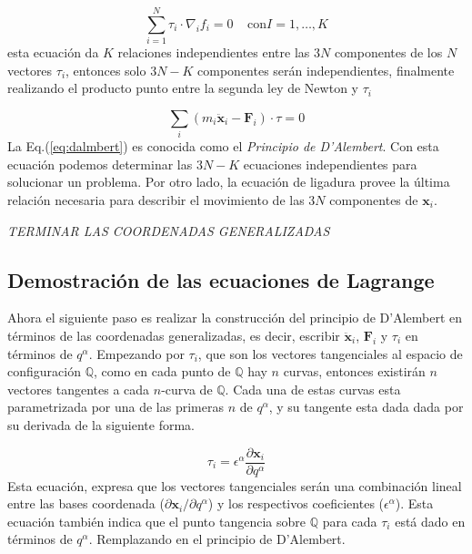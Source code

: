     \begin{equation*}
        \sum_{i = 1}^{N}\tau_i \cdot \nabla_i f_i = 0 \;\;\;\; \text{con} I = 1, \dots, K 
    \end{equation*}
    esta ecuación da $K$ relaciones independientes entre las $3N$ componentes de los $N$ vectores $\tau_i$, entonces solo $3N - K$ componentes serán independientes, finalmente realizando el producto punto entre la segunda ley de Newton y $\tau_i$

    \begin{equation}
        \sum_i (m_i\ddot{\mathbf{x}}_i - \mathbf{F}_i) \cdot \tau = 0
        \label{eq:dalmbert}
    \end{equation}
    La Eq.(\ref*{eq:dalmbert}) es conocida como el \textit{Principio de D'Alembert}. Con esta ecuación podemos determinar las $3N-K$ ecuaciones independientes para solucionar un problema. Por otro lado, la ecuación de ligadura provee la última relación necesaria para describir el movimiento de las $3N$ componentes de $\mathbf{x}_i$.

    \textit{TERMINAR LAS COORDENADAS GENERALIZADAS}
    
\subsection[short]{Demostración de las ecuaciones de Lagrange}


    Ahora el siguiente paso es realizar la construcción del principio de D'Alembert en términos de las coordenadas generalizadas, es decir, escribir $\mathbf{\ddot{x}}_i$, $\mathbf{F}_i$ y $\tau_i$ en términos de $q^{\alpha}$. Empezando por $\tau_i$, que son los vectores tangenciales al espacio de configuración $\mathbb{Q}$, como en cada punto de $\mathbb{Q}$ hay $n$ curvas, entonces existirán $n$ vectores tangentes a cada $n$-curva de $\mathbb{Q}$. Cada una de estas curvas esta parametrizada por una de las primeras $n$ de $q^{\alpha}$, y su tangente esta dada dada por su derivada de la siguiente forma. 

    \begin{equation*}
        \tau_i = \epsilon^{\alpha} \frac{\partial \mathbf{x}_i}{\partial q^{\alpha}}
    \end{equation*}
Esta ecuación, expresa que los vectores tangenciales serán una combinación lineal entre las bases coordenada ($\partial \mathbf{x}_i / \partial q^{\alpha}$) y los respectivos coeficientes ($\epsilon^{\alpha}$). Esta ecuación también indica que el punto tangencia sobre $\mathbb{Q}$ para cada $\tau_i$ está dado en términos de $q^{\alpha}$. Remplazando en el principio de D'Alembert.


